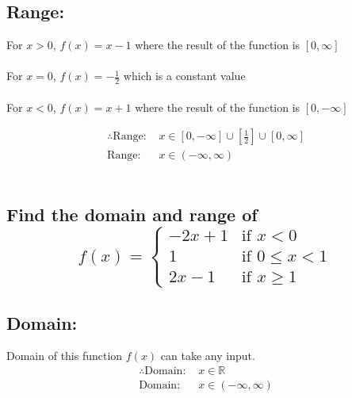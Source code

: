 \documentclass{article}
\begin{document}
\subsection*{Range: }
For $x > 0$, $f(x) = x - 1$ where the result of the function is $[0, \infty]$
\\ \\ For $x = 0$, $f(x) = -\frac{1}{2}$ which is a constant value \\ \\ For
${x < 0}$, $f(x) = x + 1$ where the result of the function is $[0, -\infty]$

\begin{align*}
	\therefore \text{Range: } & x \in [0, -\infty] \cup [\frac{1}{2}] \cup [0, \infty] \\
	\text{Range: }            & x \in (-\infty, \infty)
\end{align*}
\\

\newpage
\subsection{Find the domain and range of \[
	f(x) = \begin{cases}
		-2x + 1 	& \text{if } x < 0 \\ 
		1			& \text{if } 0 \leq x < 1\\ 
		2x - 1 		& \text{if } x \geq 1
	\end{cases}
	\]}

\subsection*{Domain: }
Domain of this function $f(x)$ can take any input.
\begin{align*}
	\therefore \text{Domain: } & x \in \mathbb{R}\\
	\text{Domain: } & x \in (-\infty, \infty)
\end{align*}
\end{document}
